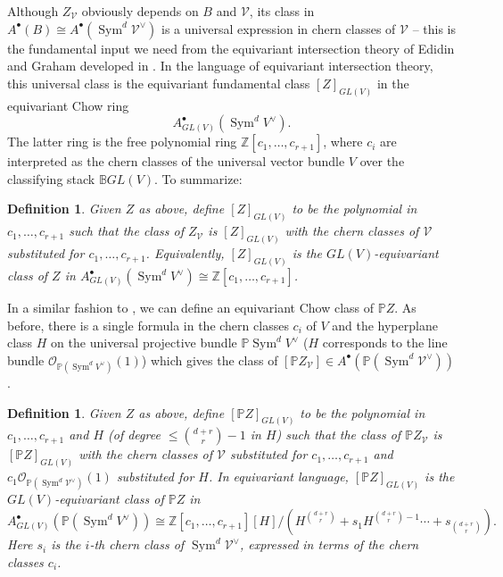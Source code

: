 \documentclass[12 pt, reqno]{amsart}
\newtheorem{defn}[thm]{Definition}
\theoremstyle{definition}
\newcommand{\on}{\operatorname}
\newcommand{\mb}{\mathbb}
\newcommand{\mc}{\mathcal}
\renewcommand{\P}{\mb{P}}
\begin{document}
Although $Z_{\mc{V}}$ obviously depends on $B$ and $\mc{V}$, its class
in $A^{\bullet}(B)\cong A^{\bullet}(\on{Sym}^d\mc{V}^{\vee})$ is a
universal expression in chern classes of $\mc{V}$ -- this is the
fundamental input we need from the equivariant intersection theory of
Edidin and Graham developed in \cite{EG98}.  In the language of
equivariant intersection theory, this universal class is the
equivariant fundamental class $[Z]_{GL(V)}$ in the equivariant Chow
ring \[A_{GL(V)}^{\bullet}(\on{Sym}^d V^{\vee}).\] The latter ring is
the free polynomial ring $\mathbb{Z}[c_1, \dots, c_{r+1}]$, where
$c_{i}$ are interpreted as the chern classes of the universal vector
bundle $V$ over the classifying stack $\mathbb{B}GL(V)$. To summarize:

\begin{defn}
\label{affinecohomology}
Given $Z$ as above, define $[Z]_{GL(V)}$ to be the polynomial in
$c_1,\ldots,c_{r+1}$ such that the class of $Z_{\mc{V}}$ is
$[Z]_{GL(V)}$ with the chern classes of $\mc{V}$ substituted for
$c_1,\ldots,c_{r+1}$. Equivalently, $[Z]_{GL(V)}$ is the
$GL(V)$-equivariant class of $Z$ in
$A_{GL(V)}^{\bullet}(\on{Sym}^dV^{\vee})\cong
\mb{Z}[c_1,\ldots,c_{r+1}]$.
\end{defn}

In a similar fashion to , we can define an
equivariant Chow class of $\P Z$. As before, there is a single formula
in the chern classes $c_{i}$ of $V$ and the hyperplane class $H$ on
the universal projective bundle $\P \on{Sym}^dV^{\vee}$ ($H$
corresponds to the line bundle
$\mathscr{O}_{\mb{P}(\on{Sym}^d V^\vee)}(1)$) which gives the class of
$[\mb{P}Z_{\mc{V}}]\in A^{\bullet}(\mb{P}(\on{Sym}^d\mc{V}^\vee))$.

\begin{defn}
\label{projectivecohomology}
Given $Z$ as above, define $[\mb{P}Z]_{GL(V)}$ to be the polynomial in
$c_1,\ldots,c_{r+1}$ and $H$ (of degree $\leq {d+r \choose r}-1$ in
$H$) such that the class of $\mb{P}Z_{\mc{V}}$ is $[\mb{P}Z]_{GL(V)}$
with the chern classes of $\mc{V}$ substituted for
$c_1,\ldots,c_{r+1}$ and
$c_{1}\mathscr{O}_{\mb{P}(\on{Sym}^d\mc{V}^\vee)}(1)$ substituted for
$H$. In equivariant language, $[\mb{P}Z]_{GL(V)}$ is the
$GL(V)$-equivariant class of $\P Z$ in
$$A_{GL(V)}^{\bullet}(\mb{P}(\on{Sym}^dV^{\vee}))\cong
\mb{Z}[c_1,\ldots,c_{r+1}][H]/(H^{d+r \choose r}+s_1H^{{d+r \choose
    r}-1}\cdots+s_{{d+r \choose r}}).$$ Here $s_{i}$ is the $i$-th
chern class of $\on{Sym}^d\mc{V}^\vee$, expressed in terms of the
chern classes $c_{i}$.
\end{defn}
\end{document}
